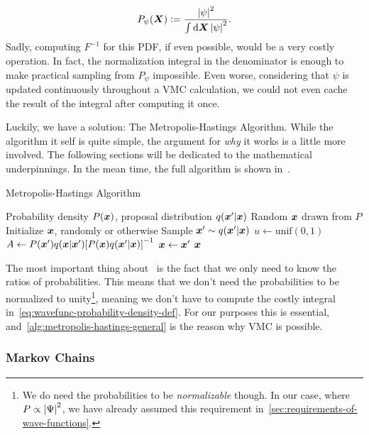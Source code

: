 \documentclass[Thesis.tex]{subfiles}
\begin{document}
\begin{align}
    P_{\psi}(\bm{X}) \vcentcolon= \frac{\abs{\psi}^2}{\int\dd{\bm{X}}\abs{\psi}^2}.
\end{align}
Sadly, computing $F^{-1}$ for this PDF, if even possible, would be a very costly
operation. In fact, the normalization integral in the denominator is enough to
make practical sampling from $P_\psi$ impossible. Even worse, considering that
$\psi$ is updated continuously throughout a VMC calculation, we could not even
cache the result of the integral after computing it once.

Luckily, we have a solution: The Metropolis-Hastings Algorithm. While the
algorithm it self is quite simple, the argument for \emph{why} it works is a
little more involved. The following sections will be dedicated to the mathematical
underpinnings. In the mean time, the full algorithm is shown in~.

\begin{algorithm}[h]
    \caption{Metropolis-Hastings Algorithm}
    \label{alg:metropolis-hastings-general}
    \begin{algorithmic}[1]
        \Require Probability density $P(\bm{x})$, proposal distribution $q(\bm{x}'|\bm{x})$
        \Ensure Random $\bm{x}$ drawn from $P$
        \State Initialize $\bm{x}$, randomly or otherwise
        \Repeat
          \State Sample $\bm{x}'\sim q(\bm{x}'|\bm{x})$
          \State $u\gets\text{unif}(0, 1)$
          \State $A\gets P(\bm{x}')q(\bm{x}|\bm{x}')\qty[P(\bm{x})q(\bm{x}'|\bm{x})]^{-1}$
            \State $\bm{x} \gets \bm{x}'$
          \EndIf
          \State \Yield $\bm{x}$
    \end{algorithmic}
\end{algorithm}

The most important thing about~ is the
fact that we only need to know the ratios of probabilities. This means that we
don't need the probabilities to be normalized to unity\footnote{We do need the
probabilities to be \emph{normalizable} though. In our case, where $P\propto
\abs{\Psi}^2$, we have already assumed this requirement
in~\cref{sec:requirements-of-wave-functions}.}, meaning we don't have to compute
the costly integral in~\cref{eq:wavefunc-probability-density-def}. For our
purposes this is essential, and~\cref{alg:metropolis-hastings-general} is the
reason why VMC is possible.

\subsubsection{Markov Chains}
\end{document}
